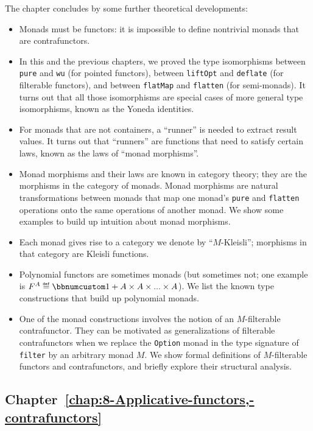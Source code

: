 The chapter concludes by some further theoretical developments:
\begin{itemize}
\item Monads must be functors: it is impossible to define nontrivial monads
that are contrafunctors.
\item In this and the previous chapters, we proved the  type isomorphisms
between \lstinline!pure! and \lstinline!wu! (for pointed functors),
between \lstinline!liftOpt! and \lstinline!deflate! (for filterable
functors), and between \lstinline!flatMap! and \lstinline!flatten!
(for semi-monads). It turns out that all those isomorphisms are special
cases of more general type isomorphisms, known as the Yoneda identities.
\item For monads that are not containers, a \textsf{``}runner\textsf{''} is needed to extract
result values. It turns out that \textsf{``}runners\textsf{''} are functions that
need to satisfy certain laws, known as the laws of \textsf{``}monad morphisms\textsf{''}.
\item Monad morphisms and their laws are known in category theory; they
are the morphisms in the category of monads. Monad morphisms are natural
transformations between monads that map one monad\textsf{'}s \lstinline!pure!
and \lstinline!flatten! operations onto the same operations of another
monad. We show some examples to build up intuition about monad morphisms.
\item Each monad gives rise to a category we denote by \textsf{``}$M$-Kleisli\textsf{''};
morphisms in that category are Kleisli functions.
\item Polynomial functors are sometimes monads (but sometimes not; one example
is $F^{A}\triangleq\bbnum 1+A\times A\times...\times A$). We list
the known type constructions that build up polynomial monads.
\item One of the monad constructions involves the notion of an $M$-filterable
contrafunctor. They can be motivated as generalizations of filterable
contrafunctors when we replace the \lstinline!Option! monad in the
type signature of \lstinline!filter! by an arbitrary monad $M$.
We show formal definitions of $M$-filterable functors and contrafunctors,
and briefly explore their structural analysis.
\end{itemize}

\subsection{Chapter~\ref{chap:8-Applicative-functors,-contrafunctors}}


